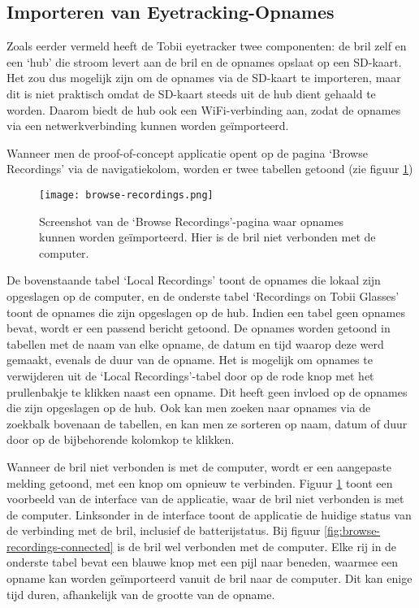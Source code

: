 
\subsection{Importeren van Eyetracking-Opnames}

Zoals eerder vermeld heeft de Tobii eyetracker twee componenten: de bril zelf en een `hub' die stroom levert aan de bril en de opnames opslaat op een SD-kaart.
Het zou dus mogelijk zijn om de opnames via de SD-kaart te importeren, maar dit is niet praktisch omdat de SD-kaart steeds uit de hub dient gehaald te worden.
Daarom biedt de hub ook een WiFi-verbinding aan, zodat de opnames via een netwerkverbinding kunnen worden geïmporteerd. 

Wanneer men de proof-of-concept applicatie opent op de pagina `Browse Recordings' via de navigatiekolom, worden er twee tabellen getoond (zie figuur \ref{fig:browse-recordings})

\begin{figure}[H]
  \centering
  \texttt{[image: browse-recordings.png]}
  \caption[]{\label{fig:browse-recordings} Screenshot van de `Browse Recordings'-pagina waar opnames kunnen worden geïmporteerd. Hier is de bril niet verbonden met de computer. }
\end{figure}


De bovenstaande tabel `Local Recordings' toont de opnames die lokaal zijn opgeslagen op de computer, en de onderste tabel `Recordings on Tobii Glasses' toont de opnames die zijn opgeslagen op de hub.
Indien een tabel geen opnames bevat, wordt er een passend bericht getoond.
De opnames worden getoond in tabellen met de naam van elke opname, de datum en tijd waarop deze werd gemaakt, evenals de duur van de opname. 
Het is mogelijk om opnames te verwijderen uit de `Local Recordings'-tabel door op de rode knop met het prullenbakje te klikken naast een opname. Dit heeft geen invloed op de opnames die zijn opgeslagen op de hub.
Ook kan men zoeken naar opnames via de zoekbalk bovenaan de tabellen, en kan men ze sorteren op naam, datum of duur door op de bijbehorende kolomkop te klikken.

Wanneer de bril niet verbonden is met de computer, wordt er een aangepaste melding getoond, met een knop om opnieuw te verbinden. Figuur \ref{fig:browse-recordings} toont een voorbeeld van de interface van de applicatie, waar de bril niet verbonden is met de computer.
Linksonder in de interface toont de applicatie de huidige status van de verbinding met de bril, inclusief de batterijstatus. Bij figuur \ref{fig:browse-recordings-connected} is de bril wel verbonden met de computer. 
Elke rij in de onderste tabel bevat een blauwe knop met een pijl naar beneden, waarmee een opname kan worden geïmporteerd vanuit de bril naar de computer. Dit kan enige tijd duren, afhankelijk van de grootte van de opname.

